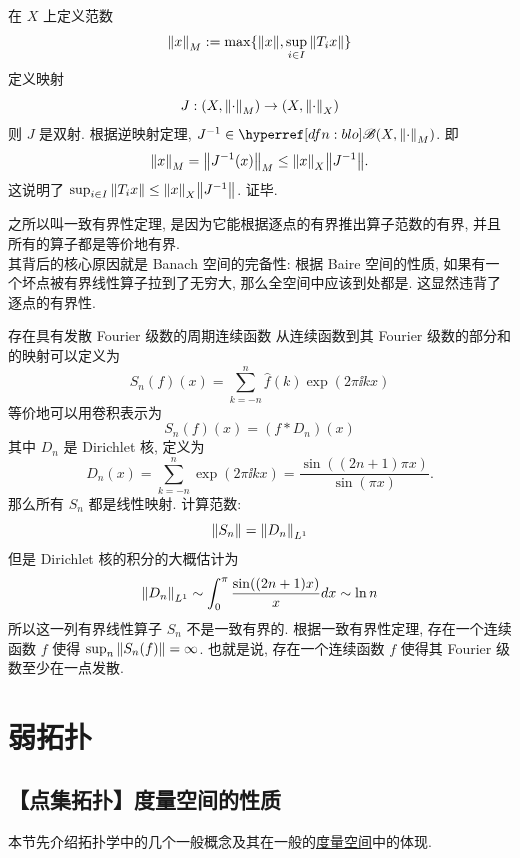         \begin{prf}
            在 \(X\) 上定义范数 
            \[\norm{x}_M:=\max\{\norm{x}, \sup_{i\in I} \norm{T_i x}\}\]
            定义映射
            \[J: (X, \norm{\cdot}_M) \to (X, \norm{\cdot}_X)\]
            则 \(J\) 是双射. 根据逆映射定理, \(J^{-1}\in\blo(X, \norm{\cdot}_M)\). 即
            \[\norm{x}_M = \norm{J^{-1}(x)}_M \leq \norm{x}_X\norm{J^{-1}}.\]
            这说明了 \(\sup_{i\in I} \norm{T_i x} \leq \norm{x}_X\norm{J^{-1}}\). 证毕.
        \end{prf}

        \begin{rmk}
            [Dedicatia]
            之所以叫一致有界性定理, 是因为它能根据逐点的有界推出算子范数的有界, 并且所有的算子都是等价地有界.\\
            其背后的核心原因就是 Banach 空间的完备性: 根据 Baire 空间的性质, 如果有一个坏点被有界线性算子拉到了无穷大, 那么全空间中应该到处都是. 这显然违背了逐点的有界性.    
        \end{rmk}

        \begin{ins}
            {存在具有发散 Fourier 级数的周期连续函数}
            从连续函数到其 Fourier 级数的部分和的映射可以定义为
            \[S_n (f) (x)=\sum_{k=-n}^n \hat{f}(k) \exp(2\pi \ii k x)\]
            等价地可以用卷积表示为
            \[S_n (f) (x) = (f \ast D_n)(x)\]
            其中 \(D_n\) 是 Dirichlet 核, 定义为
            \[D_n(x) = \sum_{k=-n}^n \exp(2\pi \ii k x) = \frac{\sin((2n+1)\pi x)}{\sin(\pi x)}.\]
            那么所有 \(S_n\) 都是线性映射. 计算范数:
            \[\norm{S_n}=\norm{D_n}_{L^1}\]
            但是 Dirichlet 核的积分的大概估计为
            \[\norm{D_n}_{L^1} \sim \int_0^{\pi} \frac{\sin((2n+1)x)}{x} dx \sim \ln n\]
            所以这一列有界线性算子 \(S_n\) 不是一致有界的. 根据一致有界性定理, 存在一个连续函数 \(f\) 使得 \(\sup_n \norm{S_n(f)} = \infty\). 也就是说, 存在一个连续函数 \(f\) 使得其 Fourier 级数至少在一点发散.
        \end{ins}

\section{弱拓扑}

    \subsection{【点集拓扑】度量空间的性质}

        \begin{intrormk}
            [Dedicatia]
            本节先介绍拓扑学中的几个一般概念及其在一般的\hyperref[dfn:ms]{度量空间}中的体现.
        \end{intrormk}

